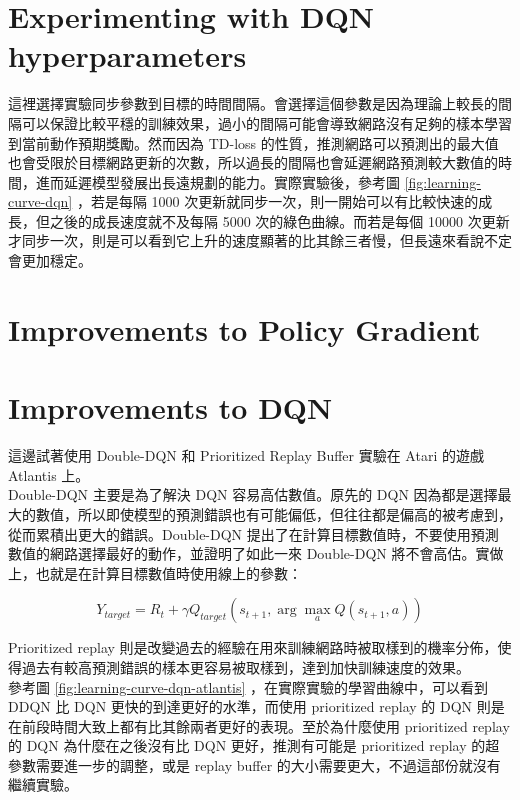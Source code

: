 \documentclass[fleqn,a4paper,12pt]{article}
\begin{document}
\section{Experimenting with DQN hyperparameters}

這裡選擇實驗同步參數到目標的時間間隔。會選擇這個參數是因為理論上較長的間隔可以保證比較平穩的訓練效果，過小的間隔可能會導致網路沒有足夠的樣本學習到當前動作預期獎勵。然而因為 TD-loss 的性質，推測網路可以預測出的最大值也會受限於目標網路更新的次數，所以過長的間隔也會延遲網路預測較大數值的時間，進而延遲模型發展出長遠規劃的能力。實際實驗後，參考圖 \ref{fig:learning-curve-dqn} ，若是每隔 1000 次更新就同步一次，則一開始可以有比較快速的成長，但之後的成長速度就不及每隔 5000 次的綠色曲線。而若是每個 10000 次更新才同步一次，則是可以看到它上升的速度顯著的比其餘三者慢，但長遠來看說不定會更加穩定。

\section{Improvements to Policy Gradient}

\section{Improvements to DQN}

這邊試著使用 Double-DQN 和 Prioritized Replay Buffer 實驗在 Atari 的遊戲 Atlantis 上。\\

Double-DQN 主要是為了解決 DQN 容易高估數值。原先的 DQN 因為都是選擇最大的數值，所以即使模型的預測錯誤也有可能偏低，但往往都是偏高的被考慮到，從而累積出更大的錯誤。Double-DQN 提出了在計算目標數值時，不要使用預測數值的網路選擇最好的動作，並證明了如此一來 Double-DQN 將不會高估。實做上，也就是在計算目標數值時使用線上的參數：

\begin{equation*}
  Y_{target} = R_t + \gamma Q_{target}(s_{t+1}, \arg \max_a Q(s_{t+1}, a))
\end{equation*}


Prioritized replay 則是改變過去的經驗在用來訓練網路時被取樣到的機率分佈，使得過去有較高預測錯誤的樣本更容易被取樣到，達到加快訓練速度的效果。\\

參考圖 \ref{fig:learning-curve-dqn-atlantis} ，在實際實驗的學習曲線中，可以看到 DDQN 比 DQN 更快的到達更好的水準，而使用 prioritized replay 的 DQN 則是在前段時間大致上都有比其餘兩者更好的表現。至於為什麼使用 prioritized replay 的 DQN 為什麼在之後沒有比 DQN 更好，推測有可能是 prioritized replay 的超參數需要進一步的調整，或是 replay buffer 的大小需要更大，不過這部份就沒有繼續實驗。
\end{document}
